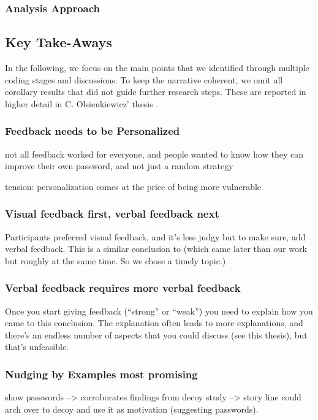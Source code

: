 \subsubsection{Analysis Approach}
\subsection{Key Take-Aways}
In the following, we focus on the main points that we identified through multiple coding stages and discussions. To keep the narrative coherent, we omit all corollary results that did not guide further research steps. These are reported in higher detail in C. Olsienkiewicz' thesis \cite{Olsienkiewicz2016BAThesis}. 
\subsubsection{Feedback needs to be Personalized}
not all feedback worked for everyone, and people wanted to know how they can improve their own password, and not just a random strategy

tension: personalization comes at the price of being more vulnerable
\subsubsection{Visual feedback first, verbal feedback next}
Participants preferred visual feedback, and it's less judgy but to make sure, add verbal feedback. This is a similar conclusion to \cite{Ur2017DataDrivenPWMeter} (which came later than our work but roughly at the same time. So we chose a timely topic.)

\subsubsection{Verbal feedback requires more verbal feedback}
Once you start giving feedback (``strong'' or ``weak'') you need to explain how you came to this conclusion. The explanation often leads to more explanations, and there's an endless number of aspects that you could discuss (see this thesis), but that's unfeasible. 


\subsubsection{Nudging by Examples most promising}
show passwords --> corroborates findings from decoy study --> story line could arch over to decoy and use it as motivation (suggesting passwords). 



